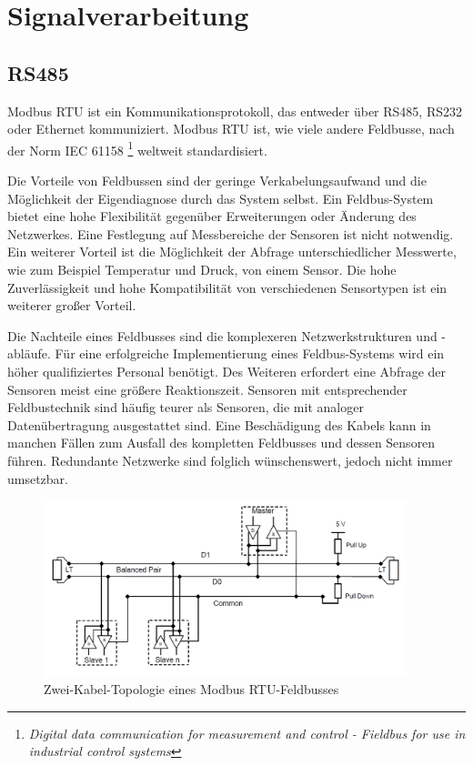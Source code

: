 \section{Signalverarbeitung}
\label{sec: Modbus RTU}

\subsection{RS485}
\label{subsec:RS485}

Modbus RTU ist ein Kommunikationsprotokoll, das entweder über RS485, RS232 oder Ethernet kommuniziert. Modbus RTU ist, wie viele andere Feldbusse, nach der Norm IEC 61158 \footnote{\textit{Digital data communication for measurement and control - Fieldbus for use in industrial control systems}} weltweit standardisiert.

Die Vorteile von Feldbussen sind der geringe Verkabelungsaufwand und die Möglichkeit der Eigendiagnose durch das System selbst. Ein Feldbus-System bietet eine hohe Flexibilität gegenüber Erweiterungen oder Änderung des Netzwerkes. Eine Festlegung auf Messbereiche der Sensoren ist nicht notwendig. Ein weiterer Vorteil ist die Möglichkeit der Abfrage unterschiedlicher Messwerte, wie zum Beispiel Temperatur und Druck, von einem Sensor. Die hohe Zuverlässigkeit und hohe Kompatibilität von verschiedenen Sensortypen ist ein weiterer großer Vorteil.

Die Nachteile eines Feldbusses sind die komplexeren Netzwerkstrukturen und -abläufe. Für eine erfolgreiche Implementierung eines Feldbus-Systems wird ein höher qualifiziertes Personal benötigt. Des Weiteren erfordert eine Abfrage der Sensoren meist eine größere Reaktionszeit. Sensoren mit  entsprechender Feldbustechnik sind häufig teurer als Sensoren, die mit analoger Datenübertragung ausgestattet sind. Eine Beschädigung des Kabels kann in manchen Fällen zum Ausfall des kompletten Feldbusses und dessen Sensoren führen. Redundante Netzwerke sind folglich wünschenswert, jedoch nicht immer umsetzbar. 

\begin{figure}[htb]
 \centering		\includegraphics[width=0.94\textwidth]{Pictures/TopologieModbus.png}
 \caption{Zwei-Kabel-Topologie eines Modbus RTU-Feldbusses \citep{MODBUS.ORG2002}  }
 \label{fig:ZweiKabelModbus}
 \end{figure} 
 
